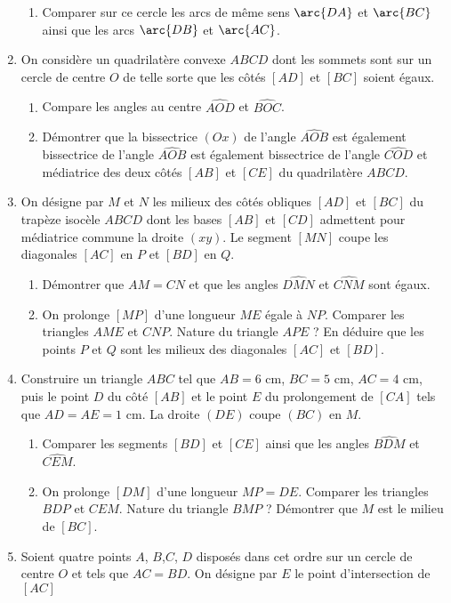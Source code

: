 \begin{enumerate}
\begin{enumerate}
\item Comparer sur ce cercle les arcs de même sens $\arc{DA}$ et $\arc{BC}$ ainsi que les arcs $\arc{DB}$ et $\arc{AC}$. 
\end{enumerate}
\item On considère un quadrilatère convexe $ABCD$ dont les sommets sont sur un cercle de centre $O$ de telle sorte que les côtés $[AD]$ et $[BC]$ soient égaux. \begin{enumerate}
\item Compare les angles au centre $\widehat{AOD}$ et $\widehat{BOC}$.
\item Démontrer que la bissectrice $(Ox)$ de l'angle $\widehat{AOB}$ est également bissectrice de l'angle $\widehat{AOB}$ est également bissectrice de l'angle $\widehat{COD}$ et médiatrice des deux côtés $[AB]$ et $[CE]$ du quadrilatère $ABCD$. 
\end{enumerate}
\item On désigne par $M$ et $N$ les milieux des côtés obliques $[AD]$ et $[BC]$ du trapèze isocèle $ABCD$ dont les bases $[AB]$ et $[CD]$ admettent pour médiatrice commune la droite $(xy)$. Le segment $[MN]$ coupe les diagonales $[AC]$ en $P$ et $[BD]$ en $Q$. \begin{enumerate}
\item Démontrer que $AM=CN$ et que les angles $\widehat{DMN}$ et $\widehat{CNM}$ sont égaux. 
\item On prolonge $[MP]$ d'une longueur $ME$ égale à $NP$. Comparer les triangles $AME$ et $CNP$. Nature du triangle $APE$ ? En déduire que les points $P$ et $Q$ sont les milieux des diagonales $[AC]$ et $[BD]$.
\end{enumerate}
\item Construire un triangle $ABC$ tel que $AB= 6$ cm, $BC=5$ cm, $AC=4$ cm, puis le point $D$ du côté $[AB]$ et le point $E$ du prolongement de $[CA]$ tels que $AD=AE=1$ cm. La droite $(DE)$ coupe $(BC)$ en $M$. \begin{enumerate}
\item Comparer les segments $[BD]$ et $[CE]$ ainsi que les angles $\widehat{BDM}$ 
et $\widehat{CEM}$.
\item On prolonge $[DM]$ d'une longueur $MP=DE$. Comparer les triangles $BDP$ et $CEM$. Nature du triangle $BMP$ ? Démontrer que $M$ est le milieu de $[BC]$. 
\end{enumerate}
\item Soient quatre points $A$, $B$,$C$, $D$ disposés dans cet ordre sur un cercle de centre $O$ et tels que $AC=BD$. On désigne par $E$ le point d'intersection de $[AC]$

\end{enumerate}
